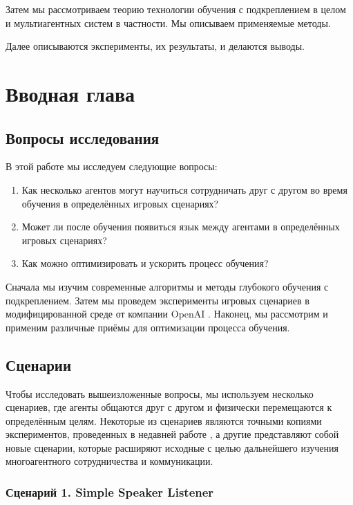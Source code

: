 Затем мы рассмотриваем теорию технологии обучения с подкреплением в целом и мультиагентных систем в частности. Мы описываем применяемые методы.

Далее описываются эксперименты, их результаты, и делаются выводы.

\chapter{Вводная глава}

\section{Вопросы исследования} \label{intro-questions}

В этой работе мы исследуем следующие вопросы:
\begin{enumerate}[1.]
	\item Как несколько агентов могут научиться сотрудничать друг с другом во время обучения в определённых игровых сценариях?
	\item Может ли после обучения появиться язык между агентами в определённых игровых сценариях?
	\item Как можно оптимизировать и ускорить процесс обучения?
\end{enumerate}

Сначала мы изучим современные алгоритмы и методы глубокого обучения с подкреплением. Затем мы проведем эксперименты игровых сценариев в модифицированной среде от компании OpenAI \cite{OpenAI-Gym}. Наконец, мы рассмотрим и применим различные приёмы для оптимизации процесса обучения.

\section{Сценарии} \label{intro:sec2}

Чтобы исследовать вышеизложенные вопросы, мы используем несколько сценариев, где агенты общаются друг с другом и физически перемещаются к определённым целям. Некоторые из сценариев являются точными копиями экспериментов, проведенных в недавней работе \cite{lowe2017multiagent}, а другие представляют собой новые сценарии, которые расширяют исходные с целью дальнейшего изучения многоагентного сотрудничества и коммуникации.

\subsection{Сценарий 1. Simple Speaker Listener} \label{intro:ssl}

